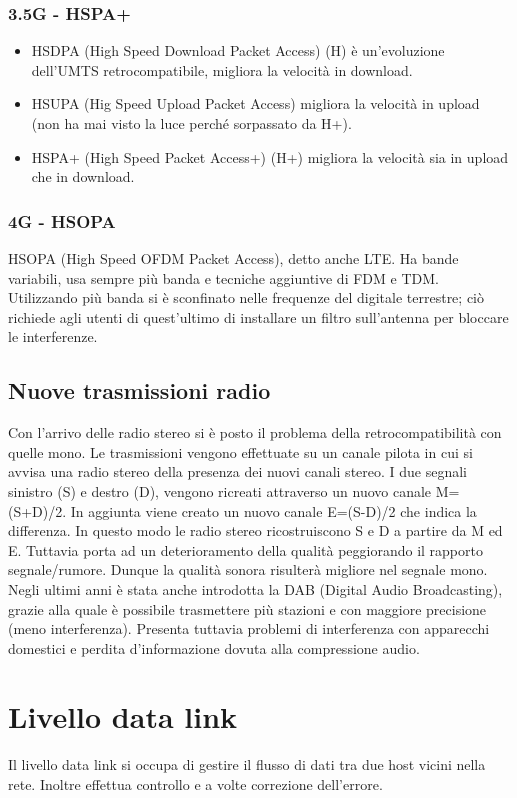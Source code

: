 \documentclass[10pt,a4paper,twoside]{article}
\begin{document}
\subsubsection{3.5G - HSPA+}
\begin{itemize}
\item HSDPA (High Speed Download Packet Access) (H) è un'evoluzione dell'UMTS retrocompatibile, migliora la velocità in download.
\item HSUPA (Hig Speed Upload Packet Access) migliora la velocità in upload (non ha mai visto la luce perché sorpassato da H+).
\item HSPA+ (High Speed Packet Access+) (H+) migliora la velocità sia in upload che in download.
\end{itemize}

\subsubsection{4G - HSOPA}
HSOPA (High Speed OFDM Packet Access), detto anche LTE. Ha bande variabili, usa sempre più banda e tecniche aggiuntive di FDM e TDM. Utilizzando più banda si è sconfinato nelle frequenze del digitale terrestre; ciò richiede agli utenti di quest'ultimo di installare un filtro sull'antenna per bloccare le interferenze.

\subsection{Nuove trasmissioni radio}
Con l'arrivo delle radio stereo si è posto il problema della retrocompatibilità con quelle mono. Le trasmissioni vengono effettuate su un canale pilota in cui si avvisa una radio stereo della presenza dei nuovi canali stereo. I due segnali sinistro (S) e destro (D), vengono ricreati attraverso un nuovo canale M=(S+D)/2. In aggiunta viene creato un nuovo canale E=(S-D)/2 che indica la differenza. In questo modo le radio stereo ricostruiscono S e D a partire da M ed E. Tuttavia porta ad un deterioramento della qualità peggiorando il rapporto segnale/rumore. Dunque la qualità sonora risulterà migliore nel segnale mono.\\
Negli ultimi anni è stata anche introdotta la DAB (Digital Audio Broadcasting), grazie alla quale è possibile trasmettere più stazioni e con maggiore precisione (meno interferenza). Presenta tuttavia problemi di interferenza con apparecchi domestici e perdita d'informazione dovuta alla compressione audio.

\section{Livello data link}
Il livello data link si occupa di gestire il flusso di dati tra due host vicini nella rete. Inoltre effettua controllo e a volte correzione dell'errore.
\end{document}
